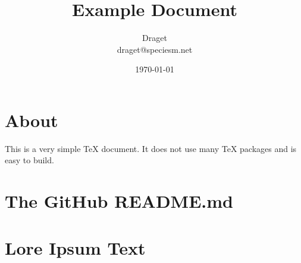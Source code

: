 \documentclass[a4paper]{article}
\title{Example Document}
\author{Draget\\draget@speciesm.net}
\date{\today}
\begin{document}
\maketitle
\newpage

\tableofcontents
\newpage

\section{About}
This is a very simple TeX document. It does not use many TeX packages and is easy to build.

\section{The GitHub README.md}

\newpage

\section{Lore Ipsum Text}

\end{document}
